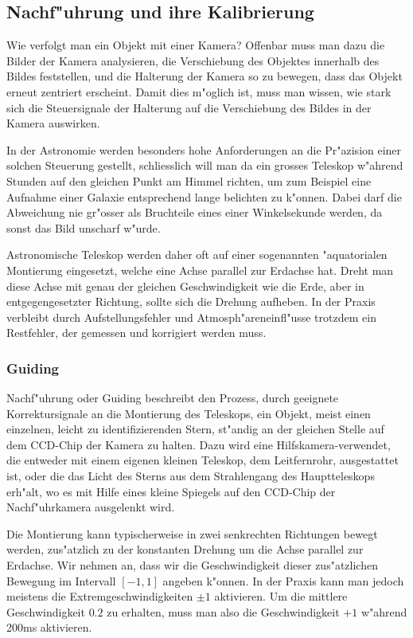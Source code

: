 %
%
%
\subsection{Nachf"uhrung und ihre Kalibrierung}
Wie verfolgt man ein Objekt mit einer Kamera?
Offenbar muss man dazu
die Bilder der Kamera analysieren, die Verschiebung des Objektes innerhalb
des Bildes feststellen, und die Halterung der Kamera so zu bewegen,
dass das Objekt erneut zentriert erscheint.
Damit dies m"oglich ist, muss man wissen, wie stark sich die Steuersignale
der Halterung auf die Verschiebung des Bildes in der Kamera auswirken.

In der Astronomie werden besonders hohe Anforderungen an die Pr"azision
einer solchen Steuerung gestellt, schliesslich will man da ein grosses
Teleskop w"ahrend Stunden auf den gleichen Punkt am Himmel richten, um
zum Beispiel eine Aufnahme einer Galaxie entsprechend lange belichten
zu k"onnen.
Dabei darf die Abweichung nie gr"osser als Bruchteile eines
einer Winkelsekunde werden, da sonst das Bild unscharf w"urde.

Astronomische Teleskop werden daher oft auf einer sogenannten
"aquatorialen Montierung eingesetzt, welche eine Achse parallel
zur Erdachse hat. Dreht man diese Achse mit genau der gleichen
Geschwindigkeit wie die Erde, aber in entgegengesetzter Richtung,
sollte sich die Drehung aufheben. In der Praxis verbleibt durch
Aufstellungsfehler und Atmosph"areneinfl"usse trotzdem ein Restfehler,
der gemessen und korrigiert werden muss.

\subsubsection{Guiding}
Nachf"uhrung oder Guiding beschreibt den Prozess, durch geeignete
Korrektursignale an die Montierung des Teleskops, ein Objekt, meist
einen einzelnen, leicht zu identifizierenden Stern, st"andig an der
gleichen Stelle auf dem CCD-Chip der Kamera zu halten. Dazu wird
eine Hilfskamera-verwendet, die entweder mit einem eigenen kleinen
Teleskop, dem Leitfernrohr, ausgestattet ist, oder die das Licht
des Sterns aus dem Strahlengang des Hauptteleskops erh"alt, wo
es mit Hilfe eines kleine Spiegels auf den CCD-Chip der Nachf"uhrkamera
ausgelenkt wird.

Die Montierung kann typischerweise in zwei senkrechten Richtungen
bewegt werden, zus"atzlich zu der konstanten Drehung um die
Achse parallel zur Erdachse.
Wir nehmen an, dass wir die Geschwindigkeit
dieser zus"atzlichen Bewegung im Intervall $[-1,1]$ angeben k"onnen.
In der Praxis kann man jedoch meistens die Extremgeschwindigkeiten
$\pm 1$ aktivieren. Um die mittlere Geschwindigkeit $0.2$ zu erhalten,
muss man also die Geschwindigkeit $+1$ w"ahrend 200ms aktivieren.

